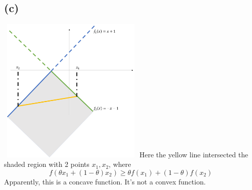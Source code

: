 \documentclass[12pt, a4 paper]{article}
\begin{document}
\begin{framed}
    
    \subsection{(c)}
    {\centering
    \includegraphics[width=7cm, height=7cm]{2.png}
    }
    Here the yellow line intersected the shaded region with 2 points $x_1, x_2$, where
    $$
    f(\theta x_1 + (1-\theta) x_2) \geq \theta f(x_1) + (1-\theta) f(x_2)
    $$
    \indent Apparently, this is a concave function. It's not a convex function.
    \end{framed}
\end{document}
